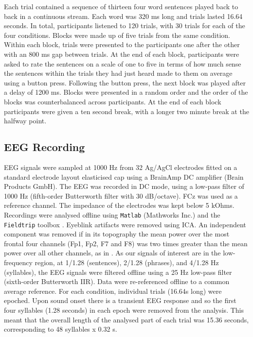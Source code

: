 \documentclass[a4paper,10pt,twoside]{article}
\begin{document}
{Each trial contained a sequence of thirteen four word sentences played back to back in a continuous stream. Each word was 320 ms long and trials lasted 16.64 seconds. In total, participants listened to 120 trials, with 30 trials for each of the four conditions. Blocks were made up of five trials from the same condition. Within each block, trials were presented to the participants one after the other with an 800 ms gap between trials. At the end of each block, participants were asked to rate the sentences on a scale of one
to five in terms of how much sense the sentences within the trials they had just heard made to them on average using a button press. Following the button press, the next block was played after a delay of 1200 ms. Blocks were presented in a random order and the order of the blocks was counterbalanced across participants. At the end of each block participants were given a ten second break, with a longer two minute break at the halfway point.

\subsection*{EEG Recording}

EEG signals were sampled at 1000 Hz from 32 Ag/AgCl electrodes fitted
on a standard electrode layout elasticised cap using a BrainAmp DC
amplifier (Brain Products GmbH). The EEG was recorded in DC mode,
using a low-pass filter of 1000 Hz (fifth-order Butterworth filter
with 30 dB/octave). FCz was used as a reference channel. The impedance
of the electrodes was kept below 5 kOhms. Recordings were analysed
offline using \texttt{Matlab} (Mathworks Inc.) and the
\texttt{Fieldtrip} toolbox \cite{FieldTrip}. Eyeblink artifacts were
removed using ICA. An independent component was removed if in its
topography the mean power over the most frontal four channels (Fp1,
Fp2, F7 and F8) was two times greater than the mean power over all
other channels, as in \citet{DingEtAl2017}. As our signals of interest
are in the low-frequency region, at 1/1.28 (sentences), 2/1.28
(phrases), and 4/1.28 Hz (syllables), the EEG signals were filtered
offline using a 25 Hz low-pass filter (sixth-order Butterworth
IIR). Data were re-referenced offline to a common average
reference. For each condition, individual trials (16.64s long) were
epoched. Upon sound onset there is a transient EEG response and so the
first four syllables (1.28 seconds) in each epoch were removed from
the analysis. This meant that the overall length of the analysed part
of each trial was 15.36 seconds, corresponding to 48 syllables x 0.32
s.


}
\end{document}
